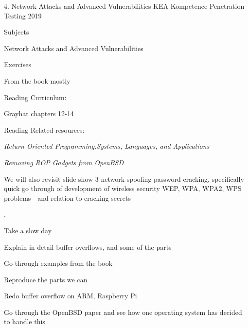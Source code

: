 \documentclass[Screen16to9,17pt]{foils}
\begin{document}
\mytitlepage
{4. Network Attacks and Advanced Vulnerabilities}
{KEA Kompetence Penetration Testing 2019}





\begin{list1}
\item Subjects
\begin{list2}
\item Network Attacks and Advanced Vulnerabilities

\end{list2}
\item Exercises
\begin{list2}
\item From the book mostly
\end{list2}
\item  Reading Curriculum:
\begin{list2}
\item Grayhat chapters 12-14
\end{list2}
\item  Reading Related resources:
\begin{list2}
\item \emph{Return-Oriented Programming:Systems, Languages, and Applications}
\item \emph{Removing ROP Gadgets from OpenBSD}
\end{list2}
\item We will also revisit slide show 3-network-spoofing-password-cracking, specifically quick go through of development of wireless security WEP, WPA, WPA2, WPS problems - and relation to cracking secrets
\end{list1}



.

\begin{list1}
\item Take a slow day
\item Explain in detail buffer overflows, and some of the parts
\item Go through examples from the book
\item Reproduce the parts we can
\item Redo buffer overflow on ARM, Raspberry Pi
\item Go through the OpenBSD paper and see how one operating system has decided to handle this
\end{list1}
\end{document}
